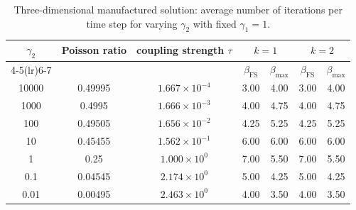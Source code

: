 \begin{table}[ht!]
\centering
\renewcommand{\arraystretch}{1.15}
\begin{tabular}{ccccccc}
\toprule
$\gamma_2$ & Poisson ratio & coupling strength $\tau$ & \multicolumn{2}{c}{$k=1$} & \multicolumn{2}{c}{$k=2$} \\
\cmidrule(lr){4-5}\cmidrule(lr){6-7}
 &  &  & $\beta_{\mathrm{FS}}$ & $\beta_{\max}$ & $\beta_{\mathrm{FS}}$ & $\beta_{\max}$ \\
\midrule
10000 & 0.49995 & $1.667 \times 10^{-4}$ & 3.00 & 4.00 & 3.00 & 4.00 \\
1000 & 0.4995 & $1.666 \times 10^{-3}$ & 4.00 & 4.75 & 4.00 & 4.75 \\
100 & 0.49505 & $1.656 \times 10^{-2}$ & 4.25 & 5.25 & 4.25 & 5.25 \\
10 & 0.45455 & $1.562 \times 10^{-1}$ & 6.00 & 6.00 & 6.00 & 6.00 \\
1 & 0.25 & $1.000 \times 10^{0}$ & 7.00 & 5.50 & 7.00 & 5.50 \\
0.1 & 0.04545 & $2.174 \times 10^{0}$ & 5.00 & 4.25 & 5.00 & 4.25 \\
0.01 & 0.00495 & $2.463 \times 10^{0}$ & 4.00 & 3.50 & 4.00 & 3.50 \\
\bottomrule
\end{tabular}
\caption{Three-dimensional manufactured solution: average number of iterations per time step for varying $\gamma_2$ with fixed $\gamma_1 = 1$.}
\label{tab:manufactured_scaling2_scan_3d}
\end{table}